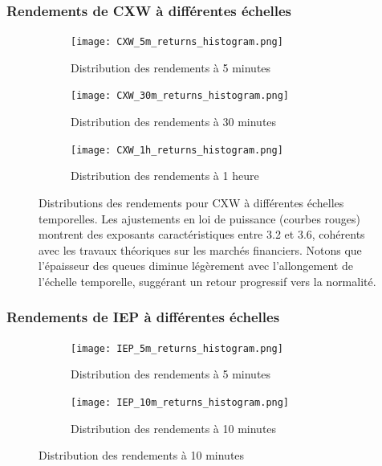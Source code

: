 \documentclass[10pt,a4paper]{article}
\theoremstyle{definition}
\theoremstyle{remark}
\begin{document}
\begin{itemize}
\subsubsection{Rendements de CXW à différentes échelles}

\begin{figure}[H]
    \centering
    \begin{subfigure}[b]{0.45\textwidth}
        \texttt{[image: CXW\_5m\_returns\_histogram.png]}
        \caption{Distribution des rendements à 5 minutes}
        \label{fig:CXW_5m_moved}
    \end{subfigure}
    \hfill
    \begin{subfigure}[b]{0.45\textwidth}
        \texttt{[image: CXW\_30m\_returns\_histogram.png]}
        \caption{Distribution des rendements à 30 minutes}
        \label{fig:CXW_30m_moved}
    \end{subfigure}
    
    \vspace{0.5cm}
    
    \begin{subfigure}[b]{0.45\textwidth}
        \texttt{[image: CXW\_1h\_returns\_histogram.png]}
        \caption{Distribution des rendements à 1 heure}
        \label{fig:CXW_1h_moved}
    \end{subfigure}
    \caption{Distributions des rendements pour CXW à différentes échelles temporelles. Les ajustements en loi de puissance (courbes rouges) montrent des exposants caractéristiques entre 3.2 et 3.6, cohérents avec les travaux théoriques sur les marchés financiers. Notons que l'épaisseur des queues diminue légèrement avec l'allongement de l'échelle temporelle, suggérant un retour progressif vers la normalité.}
    \label{fig:CXW_multi_scale_moved}
\end{figure}

\subsubsection{Rendements de IEP à différentes échelles}

\begin{figure}[H]
    \centering
    \begin{subfigure}[b]{0.45\textwidth}
        \texttt{[image: IEP\_5m\_returns\_histogram.png]}
        \caption{Distribution des rendements à 5 minutes}
        \label{fig:IEP_5m_moved}
    \end{subfigure}
    \hfill
    \begin{subfigure}[b]{0.45\textwidth}
        \texttt{[image: IEP\_10m\_returns\_histogram.png]}
        \caption{Distribution des rendements à 10 minutes}
        \label{fig:IEP_10m_moved}
    \end{subfigure}
    

\end{figure}
\end{itemize}
\end{document}
